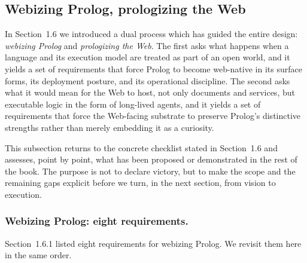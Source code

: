 \subsection{Webizing Prolog, prologizing the Web}\label{sec:vision-webizing-prologizing}
In Section~1.6 we introduced a dual process which has guided the entire design: \emph{webizing Prolog} and \emph{prologizing the Web}. The first asks what happens when a language and its execution model are treated as part of an open world, and it yields a set of requirements that force Prolog to become web-native in its surface forms, its deployment posture, and its operational discipline. The second asks what it would mean for the Web to host, not only documents and services, but executable logic in the form of long-lived agents, and it yields a set of requirements that force the Web-facing substrate to preserve Prolog's distinctive strengths rather than merely embedding it as a curiosity.

This subsection returns to the concrete checklist stated in Section~1.6 and assesses, point by point, what has been proposed or demonstrated in the rest of the book. The purpose is not to declare victory, but to make the scope and the remaining gaps explicit before we turn, in the next section, from vision to execution.

\subsubsection{Webizing Prolog: eight requirements.}
Section~1.6.1 listed eight requirements for webizing Prolog. We revisit them here in the same order.

